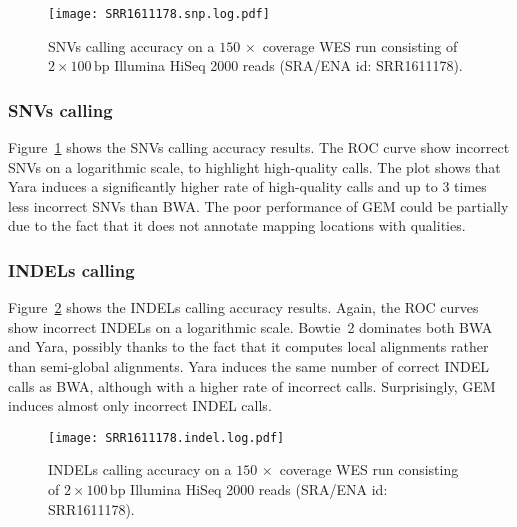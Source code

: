 \begin{figure}[t]
\begin{center}
\caption[Yara SNVs calling accuracy]{SNVs calling accuracy on a $150\, \times$ coverage WES run consisting of $2 \times 100\,\text{bp}$ Illumina HiSeq 2000 reads (SRA/ENA id: SRR1611178).}
\label{fig:yara:calling-snps}
\texttt{[image: SRR1611178.snp.log.pdf]}
\end{center}
\end{figure}


\subsubsection{SNVs calling}
Figure~\ref{fig:yara:calling-snps} shows the SNVs calling accuracy results.
The ROC curve show incorrect SNVs on a logarithmic scale, to highlight high-quality calls.
The plot shows that Yara induces a significantly higher rate of high-quality calls and up to 3 times less incorrect SNVs than BWA.
The poor performance of GEM could be partially due to the fact that it does not annotate mapping locations with qualities.

\subsubsection{INDELs calling}
Figure~\ref{fig:yara:calling-indels} shows the INDELs calling accuracy results.
Again, the ROC curves show incorrect INDELs on a logarithmic scale.
Bowtie~2 dominates both BWA and Yara, possibly thanks to the fact that it computes local alignments rather than semi-global alignments.
Yara induces the same number of correct INDEL calls as BWA, although with a higher rate of incorrect calls.
Surprisingly, GEM induces almost only incorrect INDEL calls.

\begin{figure}[t]
\begin{center}
\caption[Yara INDELs calling accuracy]{INDELs calling accuracy on a $150\, \times$ coverage WES run consisting of $2 \times 100\,\text{bp}$ Illumina HiSeq 2000 reads (SRA/ENA id: SRR1611178).}
\label{fig:yara:calling-indels}
\texttt{[image: SRR1611178.indel.log.pdf]}
\end{center}
\end{figure}

